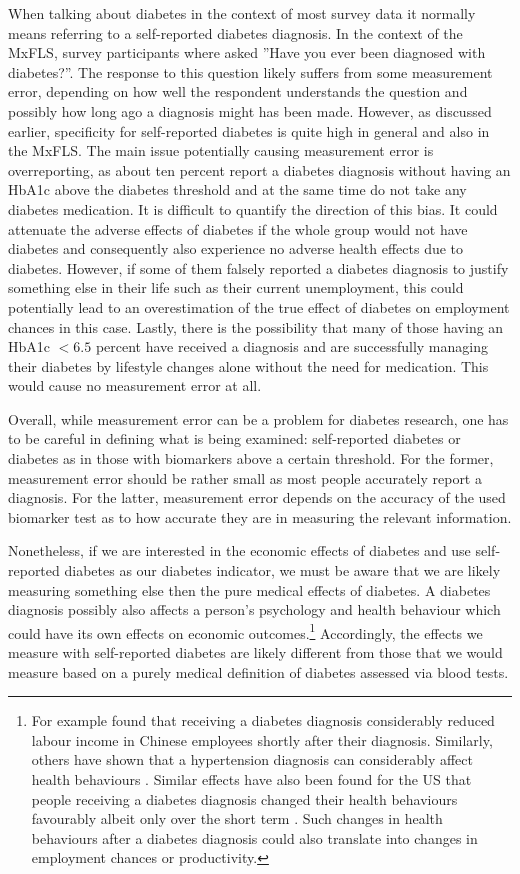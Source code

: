 When talking about diabetes in the context of most survey data it
normally means referring to a self-reported diabetes diagnosis. In
the context of the \ac{MxFLS}, survey participants where asked ''Have
you ever been diagnosed with diabetes?''. The response to this question
likely suffers from some measurement error, depending on how well
the respondent understands the question and possibly how long ago
a diagnosis might has been made. However, as discussed earlier, specificity
for self-reported diabetes is quite high in general and also in the
\ac{MxFLS}. The main issue potentially causing measurement error
is overreporting, as about ten percent report a diabetes diagnosis
without having an \ac{HbA1c} above the diabetes threshold and at
the same time do not take any diabetes medication. It is difficult
to quantify the direction of this bias. It could attenuate the adverse
effects of diabetes if the whole group would not have diabetes and
consequently also experience no adverse health effects due to diabetes.
However, if some of them falsely reported a diabetes diagnosis to
justify something else in their life such as their current unemployment,
this could potentially lead to an overestimation of the true effect
of diabetes on employment chances in this case. Lastly, there is the
possibility that many of those having an \ac{HbA1c} $<6.5$ percent
have received a diagnosis and are successfully managing their diabetes
by lifestyle changes alone without the need for medication. This would
cause no measurement error at all. 

Overall, while measurement error can be a problem for diabetes research,
one has to be careful in defining what is being examined: self-reported
diabetes or diabetes as in those with biomarkers above a certain threshold.
For the former, measurement error should be rather small as most people
accurately report a diagnosis. For the latter, measurement error depends
on the accuracy of the used biomarker test as to how accurate they
are in measuring the relevant information.

Nonetheless, if we are interested in the economic effects of diabetes
and use self-reported diabetes as our diabetes indicator, we must
be aware that we are likely measuring something else then the pure
medical effects of diabetes. A diabetes diagnosis possibly also affects
a person's psychology and health behaviour which could have its own
effects on economic outcomes.\footnote{For example \citet{Liu2014} found that receiving a diabetes diagnosis
considerably reduced labour income in Chinese employees shortly after
their diagnosis. Similarly, others have shown that a hypertension
diagnosis can considerably affect health behaviours \citep{Zhao2013a}.
Similar effects have also been found for the US that people receiving
a diabetes diagnosis changed their health behaviours favourably albeit
only over the short term \citep{Slade2012}. Such changes in health
behaviours after a diabetes diagnosis could also translate into changes
in employment chances or productivity.} Accordingly, the effects we measure with self-reported diabetes are
likely different from those that we would measure based on a purely
medical definition of diabetes assessed via blood tests.


